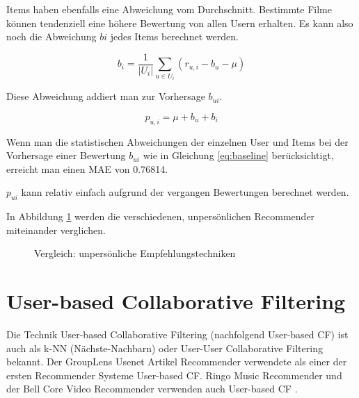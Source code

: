 \documentclass[a4paper, 12pt]{article}
\begin{document}
Items haben ebenfalls eine Abweichung vom Durchschnitt. Bestimmte Filme können tendenziell eine höhere Bewertung von allen Usern erhalten. Es kann also noch die Abweichung $bi$ jedes Items berechnet werden.

\begin{equation}
  \label{eq:bi}
  b_i = \frac{1}{|U_i|}\sum_{u \in U_i}(r_{u,i} - b_u - \mu)
\end{equation}

Diese Abweichung addiert man zur Vorhersage $b_{ui}$.

\begin{equation}
  \label{eq:baseline}
  p_{u,i} = \mu + b_u + b_i
\end{equation}

Wenn man die statistischen Abweichungen der einzelnen User und Items bei der Vorhersage einer Bewertung $b_{ui}$ wie in Gleichung \ref{eq:baseline} berücksichtigt, erreicht man einen MAE von 0.76814.

$p_{ui}$ kann relativ einfach aufgrund der vergangen Bewertungen berechnet werden.

In Abbildung \ref{fig:maebaselines} werden die verschiedenen, unpersönlichen Recommender miteinander verglichen. 

\begin{figure}
  \centering
{}
  
  \caption{Vergleich: unpersönliche Empfehlungstechniken}
  \label{fig:maebaselines}
\end{figure}


\section{User-based Collaborative Filtering}

Die Technik User-based Collaborative Filtering (nachfolgend User-based CF) ist auch als k-NN (Nächste-Nachbarn) oder User-User Collaborative Filtering bekannt. Der GroupLens Usenet Artikel Recommender verwendete als einer der ersten Recommender Systeme User-based CF. Ringo Music Recommender und der Bell Core Video Recommender verwenden auch User-based CF \cite{ekstrand11}.
\end{document}
